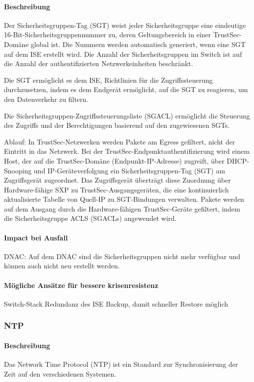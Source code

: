 \paragraph{Beschreibung}
Der Sicherheitsgruppen-Tag (SGT) weist jeder Sicherheitsgruppe eine eindeutige 16-Bit-Sicherheitsgruppennummer zu, deren Geltungsbereich in einer TrustSec-Domäne global ist. Die Nummern werden automatisch generiert, wenn eine SGT auf dem ISE erstellt wird. Die Anzahl der Sicherheitsgruppen im Switch ist auf die Anzahl der authentifizierten Netzwerkeinheiten beschränkt.

Die SGT ermöglicht es dem ISE, Richtlinien für die Zugriffssteuerung durchzusetzen, indem es dem Endgerät ermöglicht, auf die SGT zu reagieren, um den Datenverkehr zu filtern.

Die Sicherheitsgruppen-Zugriffssteuerungsliste (SGACL) ermöglicht die Steuerung des Zugriffs und der Berechtigungen basierend auf den zugewiesenen SGTs.

Ablauf: In TrustSec-Netzwerken werden Pakete am Egress gefiltert, nicht der Eintritt in das Netzwerk. Bei der TrustSec-Endpunktauthentifizierung wird einem Host, der auf die TrustSec-Domäne (Endpunkt-IP-Adresse) zugreift, über DHCP-Snooping und IP-Geräteverfolgung ein Sicherheitsgruppen-Tag (SGT) am Zugriffsgerät zugeordnet. Das Zugriffsgerät überträgt diese Zuordnung über Hardware-fähige SXP zu TrustSec-Ausgangsgeräten, die eine kontinuierlich aktualisierte Tabelle von Quell-IP zu SGT-Bindungen verwalten. Pakete werden auf dem Ausgang durch die Hardware-fähigen TrustSec-Geräte gefiltert, indem die Sicherheitsgruppe ACLS (SGACLs) angewendet wird.

\paragraph{Impact bei Ausfall}
DNAC: Auf dem DNAC sind die Sicherheitsgruppen nicht mehr verfügbar und können auch nicht neu erstellt werden.

\paragraph{Mögliche Ansätze für bessere krisenresistenz}
Switch-Stack
Redundanz des ISE
Backup, damit schneller Restore möglich


\subsubsection{NTP}
\paragraph{Beschreibung}
Das Network Time Protocol (NTP) ist ein Standard zur Synchronisierung der Zeit auf den verschiedenen Systemen.

